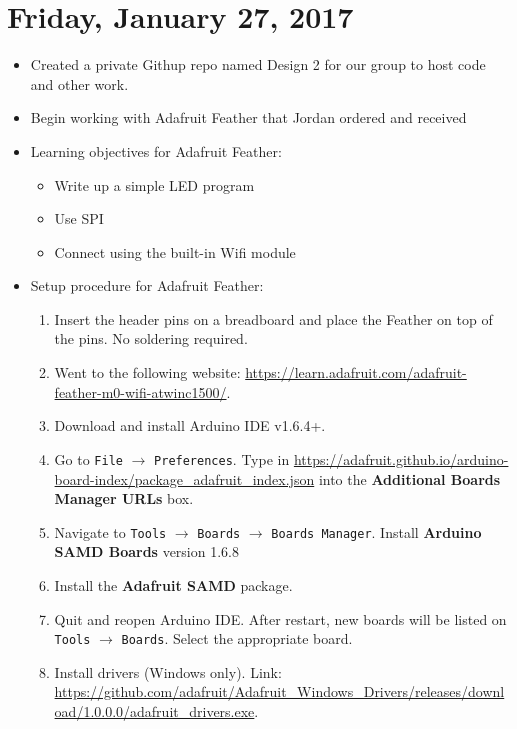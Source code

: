 \documentclass[12pt]{article}
\begin{document}
\section*{Friday, January 27, 2017}
\begin{itemize}
\item Created a private Githup repo named Design 2 for our group to host code and other work.
\item Begin working with Adafruit Feather that Jordan ordered and received
\item Learning objectives for Adafruit Feather:
	\begin{itemize}
	\item Write up a simple LED program
	\item Use SPI
	\item Connect using the built-in Wifi module
	\end{itemize}
\item Setup procedure for Adafruit Feather:
	\begin{enumerate}
	\item Insert the header pins on a breadboard and place the Feather on top of the pins. No soldering required.
	\item Went to the following website: \url{https://learn.adafruit.com/adafruit-feather-m0-wifi-atwinc1500/}.
	\item Download and install Arduino IDE v1.6.4+.
	\item Go to \texttt{File} $\rightarrow$ \texttt{Preferences}. Type in \url{https://adafruit.github.io/arduino-board-index/package_adafruit_index.json} into the \textbf{Additional Boards Manager URLs} box.
	\item Navigate to \texttt{Tools} $\rightarrow$ \texttt{Boards} $\rightarrow$ \texttt{Boards Manager}. Install \textbf{Arduino SAMD Boards} version 1.6.8
	\item Install the \textbf{Adafruit SAMD} package.
	\item Quit and reopen Arduino IDE. After restart, new boards will be listed on \texttt{Tools} $\rightarrow$ \texttt{Boards}. Select the appropriate board.
	\item Install drivers (Windows only). Link: \url{https://github.com/adafruit/Adafruit_Windows_Drivers/releases/download/1.0.0.0/adafruit_drivers.exe}.
	\end{enumerate}

\end{itemize}
\end{document}
